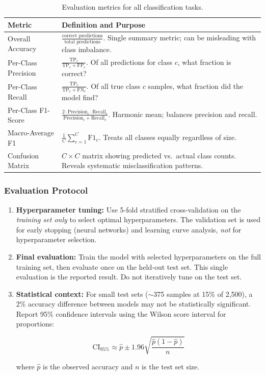 \documentclass[11pt,letterpaper]{article}
\begin{document}
	\begin{table}[ht!]
		\centering
		\caption{Evaluation metrics for all classification tasks.}
		\label{tab:metrics}
		\renewcommand{\arraystretch}{1.3}
		\begin{tabularx}{\textwidth}{l X}
			\toprule
			\textbf{Metric} & \textbf{Definition and Purpose} \\
			\midrule
			Overall Accuracy & $\frac{\text{correct predictions}}{\text{total predictions}}$. Single summary metric; can be misleading with class imbalance. \\
			Per-Class Precision & $\frac{\text{TP}_c}{\text{TP}_c + \text{FP}_c}$. Of all predictions for class $c$, what fraction is correct? \\
			Per-Class Recall & $\frac{\text{TP}_c}{\text{TP}_c + \text{FN}_c}$. Of all true class $c$ samples, what fraction did the model find? \\
			Per-Class F1-Score & $\frac{2 \cdot \text{Precision}_c \cdot \text{Recall}_c}{\text{Precision}_c + \text{Recall}_c}$. Harmonic mean; balances precision and recall. \\
			Macro-Average F1 & $\frac{1}{C} \sum_{c=1}^{C} \text{F1}_c$. Treats all classes equally regardless of size. \\
			Confusion Matrix & $C \times C$ matrix showing predicted vs.\ actual class counts. Reveals systematic misclassification patterns. \\
			\bottomrule
		\end{tabularx}
	\end{table}

	\subsubsection{Evaluation Protocol}

	\begin{enumerate}[leftmargin=2em]
		\item \textbf{Hyperparameter tuning:} Use 5-fold stratified cross-validation on the \emph{training set only} to select optimal hyperparameters. The validation set is used for early stopping (neural networks) and learning curve analysis, \emph{not} for hyperparameter selection.
		\item \textbf{Final evaluation:} Train the model with selected hyperparameters on the full training set, then evaluate once on the held-out test set. This single evaluation is the reported result. Do not iteratively tune on the test set.
		\item \textbf{Statistical context:} For small test sets ($\sim$375 samples at 15\% of 2,500), a 2\% accuracy difference between models may not be statistically significant. Report 95\% confidence intervals using the Wilson score interval for proportions:

		\begin{equation}
			\text{CI}_{95\%} \approx \hat{p} \pm 1.96 \sqrt{\frac{\hat{p}(1-\hat{p})}{n}}
			\label{eq:ci}
		\end{equation}

		where $\hat{p}$ is the observed accuracy and $n$ is the test set size.
	\end{enumerate}
\end{document}
